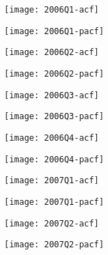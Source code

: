 \begin{figure}[htp]
	\centering
	\begin{subfigure}{0.23\textwidth}
		\centering
		\texttt{[image: 2006Q1-acf]}
	\end{subfigure}
	\begin{subfigure}{0.23\textwidth}
		\centering
		\texttt{[image: 2006Q1-pacf]}
	\end{subfigure}
	\begin{subfigure}{0.23\textwidth}
		\centering
		\texttt{[image: 2006Q2-acf]}
	\end{subfigure}
	\begin{subfigure}{0.23\textwidth}
		\centering
		\texttt{[image: 2006Q2-pacf]}
	\end{subfigure}
\end{figure}

\begin{figure}[htp]
	\centering
	\begin{subfigure}{0.23\textwidth}
		\centering
		\texttt{[image: 2006Q3-acf]}
	\end{subfigure}
	\begin{subfigure}{0.23\textwidth}
		\centering
		\texttt{[image: 2006Q3-pacf]}
	\end{subfigure}
	\begin{subfigure}{0.23\textwidth}
		\centering
		\texttt{[image: 2006Q4-acf]}
	\end{subfigure}
	\begin{subfigure}{0.23\textwidth}
		\centering
		\texttt{[image: 2006Q4-pacf]}
	\end{subfigure}
\end{figure}



\begin{figure}[htp]
	\centering
	\begin{subfigure}{0.23\textwidth}
		\centering
		\texttt{[image: 2007Q1-acf]}
	\end{subfigure}
	\begin{subfigure}{0.23\textwidth}
		\centering
		\texttt{[image: 2007Q1-pacf]}
	\end{subfigure}
	\begin{subfigure}{0.23\textwidth}
		\centering
		\texttt{[image: 2007Q2-acf]}
	\end{subfigure}
	\begin{subfigure}{0.23\textwidth}
		\centering
		\texttt{[image: 2007Q2-pacf]}
	\end{subfigure}
\end{figure}


